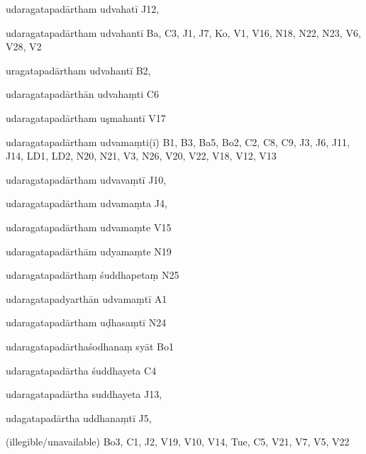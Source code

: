 \begin{ekdosis}
\begin{marma}[hp01_055]
\begin{marma}[hp02_009]
\begin{marma}[hp02_011]
\begin{marma}[hp02_25d]
\begin{description}
          \end{description}
        \end{marma}          

        \begin{marma}[hp02_26a]
        \item[udaragatapadārtham udvahatī] J12,
        \item[udaragatapadārtham udvahantī] Ba, C3, J1, J7, Ko, V1, V16, N18, N22, N23, V6, V28, V2
        \item[uragatapadārtham udvahantī] B2,
        \item[udaragatapadārthān udvahaṃti] C6
        \item[udaragatapadārtham uşmahantī] V17
        \item[udaragatapadārtham udvamaṃti(ī)] B1, B3, Ba5, Bo2, C2, C8, C9, J3, J6, J11, J14, LD1, LD2, N20, N21, V3, N26, V20, V22, V18, V12, V13
        \item[udaragatapadārtham udvavaṃtī] J10,
        \item[udaragatapadārtham udvamaṃta] J4,
        \item[udaragatapadārtham udvamaṃte] V15
        \item[udaragatapadārthām udyamaṃte] N19
        \item[udaragatapadārthaṃ śuddhapetaṃ] N25
        \item[udaragatapadyarthān udvamaṃtī] A1
        \item[udaragatapadārtham uḍhasaṃtī] N24
        \item[udaragatapadārthaśodhanaṃ syāt] Bo1
        \item[udaragatapadārtha śuddhayeta] C4
        \item[udaragatapadārtha suddhayeta] J13,
        \item[udagatapadārtha uddhanaṃtī] J5,
        \item[(illegible/unavailable)] Bo3, C1, J2, V19, V10, V14, Tue, C5, V21, V7, V5, V22
          \begin{description}
          \end{description}
        \end{marma}


\end{marma}
\end{marma}
\end{marma}
\end{ekdosis}
